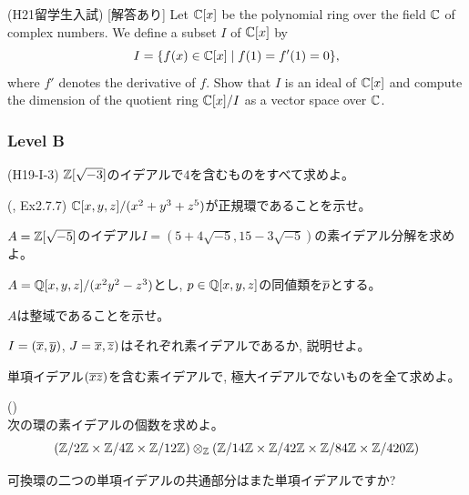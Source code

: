 \begin{prob} (H21留学生入試) [解答あり] \label{prob:H21F3}
Let $\mathbb{C}[x]$ be the polynomial ring over the field $\mathbb{C}$ of complex numbers.  We define a subset $I$ of $\mathbb{C}[x]$ by
\[I= \{ f(x)\in \mathbb{C}[x]\mid f(1) = f'(1) = 0 \},\]
where $f'$ denotes the derivative of $f$.  Show that $I$ is an ideal of $\mathbb{C}[x]$ and compute the dimension of the quotient ring $\mathbb{C}[x]/I$ as a vector space over $\mathbb{C}$.
\end{prob}

\subsubsection{Level B}


\begin{prob} (H19-I-3) \label{prob:H19I3}
$\mathbb{Z}[\sqrt{-3}]$のイデアルで$4$を含むものをすべて求めよ。
\end{prob}


\begin{prob} (\cite{aoyukie}, Ex2.7.7)
$\mathbb{C}[x,y,z]/(x^2+y^3+z^5)$が正規環であることを示せ。
\end{prob}

\begin{prob}
$A=\mathbb{Z}[\sqrt{-5}]$のイデアル$I=(5+4\sqrt{-5}, 15-3\sqrt{-5})$の素イデアル分解を求めよ。
\end{prob}

\begin{prob}
$A=\mathbb{Q}[x,y,z]/(x^2y^2-z^3)$とし, $p\in \mathbb{Q}[x,y,z]$の同値類を$\overline{p}$とする。
\ben
\item $A$は整域であることを示せ。
\item $I=(\overline{x},\overline{y})$, $J=\overline{x},\overline{z})$はそれぞれ素イデアルであるか, 説明せよ。
\item 単項イデアル$(\overline{x}\overline{z})$を含む素イデアルで, 極大イデアルでないものを全て求めよ。
\een
\end{prob}

\begin{prob} (\tf{}) \checkbox\\
次の環の素イデアルの個数を求めよ。
{\small
\[\left( \mathbb{Z}/2\mathbb{Z}\times \mathbb{Z}/4\mathbb{Z}\times \mathbb{Z}/12\mathbb{Z} \right)\mathbin{\otimes}_{\mathbb{Z}} \left( \mathbb{Z}/14\mathbb{Z}\times \mathbb{Z}/42\mathbb{Z}\times \mathbb{Z}/84\mathbb{Z}\times\mathbb{Z}/420\mathbb{Z} \right) \]
}
\end{prob}

\begin{prob}
可換環の二つの単項イデアルの共通部分はまた単項イデアルですか?
\end{prob}


